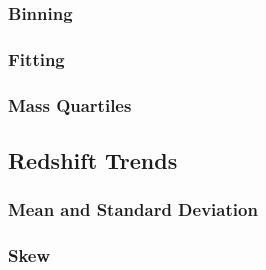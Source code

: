 \subsubsection{Binning}
\label{subsubsec:analysis--difference_histograms--binning}



\subsubsection{Fitting}
\label{subsubsec:analysis--difference_histograms--fitting}



\subsubsection{Mass Quartiles}
\label{subsubsec:analysis--difference_histograms--mass_quartiles}




\subsection{Redshift Trends}
\label{subsec:analysis--redshift_trends}



\subsubsection{Mean and Standard Deviation}
\label{subsubsec:analysis--redshift_trends--mean_stdev}



\subsubsection{Skew}
\label{subsubsec:analysis--redshift_trends--skew}



